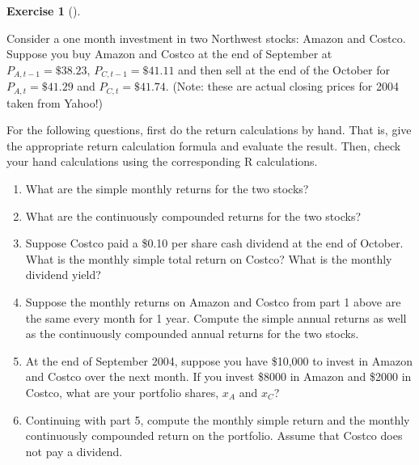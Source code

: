 \documentclass[
  letterpaper,
  DIV=11,
  numbers=noendperiod]{scrreprt}
\providecommand{\tightlist}{%
  \setlength{\itemsep}{0pt}\setlength{\parskip}{0pt}}\usepackage{longtable,booktabs,array}
\theoremstyle{definition}
\newtheorem{exercise}{Exercise}[chapter]
\theoremstyle{definition}
\theoremstyle{remark}
\begin{document}
\begin{exercise}[]\protect\hypertarget{exr-exercise0105}{}\label{exr-exercise0105}

Consider a one month investment in two Northwest stocks: Amazon and
Costco. Suppose you buy Amazon and Costco at the end of September at
\(P_{A,t-1}=\$38.23\), \(P_{C,t-1}=\$41.11\) and then sell at the end of
the October for \(P_{A,t}=\$41.29\) and \(P_{C,t}=\$41.74\). (Note:
these are actual closing prices for 2004 taken from Yahoo!)

For the following questions, first do the return calculations by hand.
That is, give the appropriate return calculation formula and evaluate
the result. Then, check your hand calculations using the corresponding R
calculations.

\begin{enumerate}
\def\labelenumi{\arabic{enumi}.}
\tightlist
\item
  What are the simple monthly returns for the two stocks?
\item
  What are the continuously compounded returns for the two stocks?
\item
  Suppose Costco paid a \$0.10 per share cash dividend at the end of
  October. What is the monthly simple total return on Costco? What is
  the monthly dividend yield?
\item
  Suppose the monthly returns on Amazon and Costco from part 1 above are
  the same every month for 1 year. Compute the simple annual returns as
  well as the continuously compounded annual returns for the two stocks.
\item
  At the end of September 2004, suppose you have \$10,000 to invest in
  Amazon and Costco over the next month. If you invest \$8000 in Amazon
  and \$2000 in Costco, what are your portfolio shares, \(x_{A}\) and
  \(x_{C}\)?
\item
  Continuing with part 5, compute the monthly simple return and the
  monthly continuously compounded return on the portfolio. Assume that
  Costco does not pay a dividend.
\end{enumerate}

\end{exercise}
\end{document}
